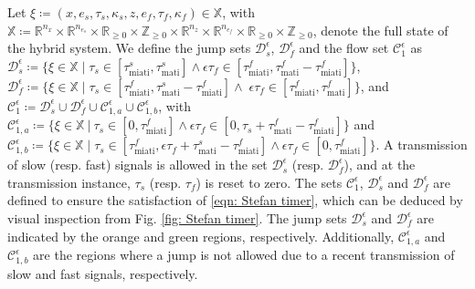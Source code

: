 Let $\xi \coloneqq (x,e_s, \tau_s, \kappa_s, z,e_f, \tau_f,  \kappa_f)\in \mathbb{X}$,
with $\mathbb{X}\coloneqq \mathbb{R}^{n_x}\times \mathbb{R}^{n_{e_s}}\times  \mathbb{R}_{\geq 0} \times \mathbb{Z}_{\geq 0} \times \mathbb{R}^{n_z}\times \mathbb{R}^{n_{e_f}}\times \mathbb{R}_{\geq 0} \times \mathbb{Z}_{\geq 0}$, 
denote the full state of the hybrid system. We define the jump sets $\mathcal{D}_s^\epsilon$, $\mathcal{D}_f^\epsilon$ and the flow set $\mathcal{C}_1^\epsilon$ as
%
$\mathcal{D}_s^\epsilon \coloneqq  \{\xi \in \mathbb{X} \; | \; \tau_s \in [\tau_{\text{miati}}^s, \tau_{\text{mati}}^s] \wedge \epsilon \tau_f \in  [\tau_{\text{miati}}^f,  \tau_{\text{mati}}^f - \tau_{\text{miati}}^f]  \}$,
%
$\mathcal{D}_f^\epsilon \coloneqq \{\xi \in \mathbb{X} \; | \; \tau_s \in [\tau_{\text{miati}}^f, \tau_{\text{mati}}^s-\tau_{\text{miati}}^f]    \wedge\; \epsilon \tau_f \in  [\tau_{\text{miati}}^f, \tau_{\text{mati}}^f]   \}$,
%
and
$\mathcal{C}_1^\epsilon \coloneqq 
        \mathcal{D}_s^\epsilon \cup \mathcal{D}_f^\epsilon \cup \mathcal{C}_{1,a}^\epsilon \cup \mathcal{C}_{1,b}^\epsilon$,
%
%
with $\mathcal{C}_{1,a}^\epsilon \coloneqq \{ \xi \in \mathbb{X} \ | \ \tau_s \in [0, \tau_{\text{miati}}^f]  \wedge \epsilon \tau_f \in [0,\tau_s + \tau_{\text{mati}}^f - \tau_{\text{miati}}^f] \} $ and 
$\mathcal{C}_{1,b}^\epsilon \coloneqq \{ \xi \in \mathbb{X} \;|\; \tau_s \in [\tau_{\text{miati}}^f, \epsilon \tau_f + \tau_{\text{mati}}^s - \tau_{\text{miati}}^f]  \wedge \epsilon \tau_f \in  [0, \tau_{\text{miati}}^f]  \}$. 
%
A transmission of slow (resp. fast) signals is allowed in the set $\mathcal{D}_s^\epsilon$ (resp. $\mathcal{D}_f^\epsilon$), and at the transmission instance, $\tau_s$ (resp. $\tau_f$) is reset to zero.
%
The sets $\mathcal{C}_1^\epsilon$, $\mathcal{D}_s^\epsilon$ and $\mathcal{D}_f^\epsilon$ are defined to ensure the
satisfaction of \eqref{eqn: Stefan timer}, which can be deduced by visual inspection from Fig. \ref{fig: Stefan timer}. The jump sets $\mathcal{D}_s^\epsilon$ and $\mathcal{D}_f^\epsilon$ are indicated by the orange and green regions, respectively. Additionally, $\mathcal{C}_{1,a}^\epsilon$ and $\mathcal{C}_{1,b}^\epsilon$ are the regions where a jump is not allowed due to a recent transmission of slow and fast signals, respectively.

